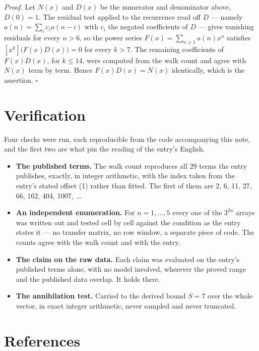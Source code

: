\documentclass[11pt]{article}
\theoremstyle{definition}
\begin{document}
{\itshape Proof.} Let $N(x)$ and $D(x)$ be the numerator and denominator above, $D(0)=1$. The residual test applied to the recurrence read off $D$ --- namely $a(n) = \sum_i c_i a(n-i)$ with $c_i$ the negated coefficients of $D$ --- gives vanishing residuals for every $n > 6$, so the power series $F(x)=\sum_{n\ge 1}a(n)x^n$ satisfies $[x^k]\bigl(F(x)D(x)\bigr) = 0$ for every $k > 7$. The remaining coefficients of $F(x)D(x)$, for $k \le 14$, were computed from the walk count and agree with $N(x)$ term by term. Hence $F(x)D(x) = N(x)$ identically, which is the assertion. $\square$

\section{Verification}

Four checks were run, each reproducible from the code accompanying this note, and the first two are what pin the reading of the entry's English.

\begin{itemize}

\item {\bfseries The published terms.} The walk count reproduces all 29 terms the entry publishes, exactly, in integer arithmetic, with the index taken from the entry's stated offset (1) rather than fitted. The first of them are 2, 6, 11, 27, 66, 162, 404, 1007,~\dots

\item {\bfseries An independent enumeration.} For $n = 1,\dots,5$ every one of the $3^{2n}$ arrays was written out and tested cell by cell against the condition as the entry states it --- no transfer matrix, no row window, a separate piece of code. The counts agree with the walk count and with the entry.

\item {\bfseries The claim on the raw data.} Each claim was evaluated on the entry's published terms alone, with no model involved, wherever the proved range and the published data overlap. It holds there.

\item {\bfseries The annihilation test.} Carried to the derived bound $S = 7$ over the whole vector, in exact integer arithmetic, never sampled and never truncated.

\end{itemize}

\section{References}
\end{document}
